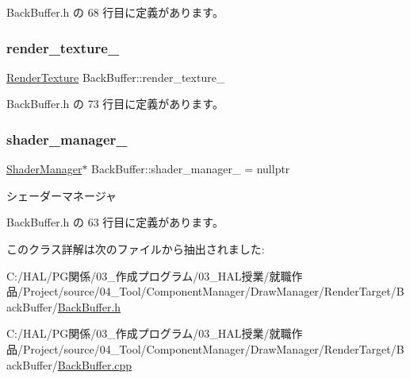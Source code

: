  Back\+Buffer.\+h の 68 行目に定義があります。

\mbox{\label{class_back_buffer_ae6040bcf1ad445c54527b6d094453560}} 
\subsubsection{\texorpdfstring{render\+\_\+texture\+\_\+}{render\_texture\_}}
{\footnotesize\ttfamily \mbox{\hyperlink{class_render_texture}{Render\+Texture}} Back\+Buffer\+::render\+\_\+texture\+\_\+\hspace{0.3cm}{\ttfamily [private]}}



 Back\+Buffer.\+h の 73 行目に定義があります。

\mbox{\label{class_back_buffer_a559b286c9e1803110daddca158704696}} 
\subsubsection{\texorpdfstring{shader\+\_\+manager\+\_\+}{shader\_manager\_}}
{\footnotesize\ttfamily \mbox{\hyperlink{class_shader_manager}{Shader\+Manager}}$\ast$ Back\+Buffer\+::shader\+\_\+manager\+\_\+ = nullptr\hspace{0.3cm}{\ttfamily [private]}}



シェーダーマネージャ 



 Back\+Buffer.\+h の 63 行目に定義があります。



このクラス詳解は次のファイルから抽出されました\+:\begin{DoxyCompactItemize}
\item 
C\+:/\+H\+A\+L/\+P\+G関係/03\+\_\+作成プログラム/03\+\_\+\+H\+A\+L授業/就職作品/\+Project/source/04\+\_\+\+Tool/\+Component\+Manager/\+Draw\+Manager/\+Render\+Target/\+Back\+Buffer/\mbox{\hyperlink{_back_buffer_8h}{Back\+Buffer.\+h}}\item 
C\+:/\+H\+A\+L/\+P\+G関係/03\+\_\+作成プログラム/03\+\_\+\+H\+A\+L授業/就職作品/\+Project/source/04\+\_\+\+Tool/\+Component\+Manager/\+Draw\+Manager/\+Render\+Target/\+Back\+Buffer/\mbox{\hyperlink{_back_buffer_8cpp}{Back\+Buffer.\+cpp}}\end{DoxyCompactItemize}
